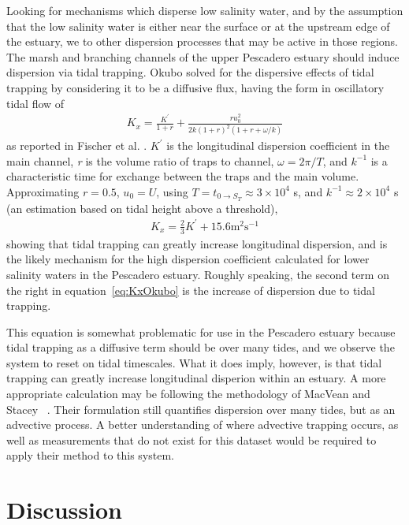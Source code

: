 Looking for mechanisms which disperse low salinity water, and by the assumption that the low salinity water is either near the surface or at the upstream edge of the estuary, we to other dispersion processes that may be active in those regions. The marsh and branching channels of the upper Pescadero estuary should induce dispersion via tidal trapping. Okubo \parencite*{okubo_effect_1973} solved for the dispersive effects of tidal trapping by considering it to be a diffusive flux, having the form in oscillatory tidal flow of
\begin{eqnarray}
K_x = \frac{K^{'}}{1+r} + \frac{ru_0^2}{2k(1+r)^2(1+r+\omega / k)} \label{eq:KxOkubo}
\end{eqnarray}
as reported in Fischer et al. \parencite{fischer_mixing_1979}. $K^{'}$ is the longitudinal dispersion coefficient in the main channel, \emph{r} is the volume ratio of traps to channel, $\omega=2\pi/T$, and $k^{-1}$ is a characteristic time for exchange between the traps and the main volume. Approximating $r=0.5$, $u_0=U$, using $T = t_{0\rightarrow S_T} \approx 3\times10^4$ s, and $k^{-1}\approx 2\times10^4$ s (an estimation based on tidal height above a threshold), 
\begin{eqnarray}
K_x = \frac{2}{3}K^{'} + 15.6 \mathrm{m}^2 \mathrm{s}^{-1} \label{eq:KxOkubownumbers}
\end{eqnarray}
showing that tidal trapping can greatly increase longitudinal dispersion, and is the likely mechanism for the high dispersion coefficient calculated for lower salinity waters in the Pescadero estuary. Roughly speaking, the second term on the right in equation~\ref{eq:KxOkubo} is the increase of dispersion due to tidal trapping.

This equation is somewhat problematic for use in the Pescadero estuary because tidal trapping as a diffusive term should be over many tides, and we observe the system to reset on tidal timescales. What it does imply, however, is that tidal trapping can greatly increase longitudinal disperion within an estuary. A more appropriate calculation may be following the methodology of MacVean and Stacey ~\parencite*{macvean_estuarine_2011}. Their formulation still quantifies dispersion over many tides, but as an advective process. A better understanding of where advective trapping occurs, as well as measurements that do not exist for this dataset would be required to apply their method to this system. 

\section{Discussion} \label{sec:discCh4}

